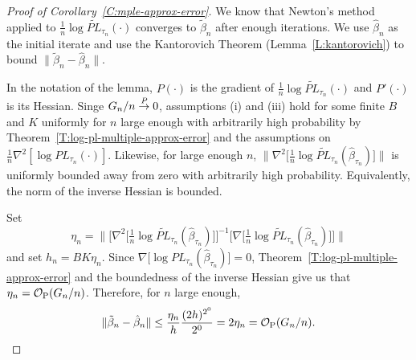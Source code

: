 \documentclass[aoas,preprint]{imsart}
\begin{document}
\begin{proof}[Proof of Corollary~\ref{C:mple-approx-error}]

We know that Newton's method applied to
$\tfrac{1}{n}\log \widetilde{\mathit{PL}}_{\tau_n}(\cdot)$ converges to
$\tilde \beta_n$ after enough iterations.  We use $\hat \beta_n$ as the
initial iterate and use the Kantorovich Theorem (Lemma~\ref{L:kantorovich})
to bound $\|\tilde \beta_n - \hat \beta_n\|$.  

In the notation of the lemma, $P(\cdot)$ is the gradient of
$\tfrac{1}{n} \log \widetilde{\mathit{PL}}_{\tau_n}(\cdot)$ and $P'(\cdot)$ is its Hessian.
Singe $G_n/n \overset{\mathit{P}}{\to} 0$, assumptions (i) and (iii) hold for
some finite $B$ and $K$ uniformly for $n$ large enough with arbitrarily
high probability by
Theorem~\ref{T:log-pl-multiple-approx-error}
and the assumptions on $\tfrac{1}{n} \nabla^2 [\log {\mathit{PL}}_{\tau_n}(\cdot)]$.
Likewise, for large enough $n$,
\(
    \Big\|
        \nabla^2\big[
            \tfrac{1}{n}
            \log \widetilde{\mathit{PL}}_{\tau_n}(\hat \beta_{\tau_n})
        \big]
    \Big\|
\)
is uniformly bounded away from zero with arbitrarily high probability.
Equivalently, the norm of the inverse Hessian is bounded.

Set
\[
    \eta_n =
    \Big\|
        \Big[
            \nabla^2\big[
                \tfrac{1}{n}
                \log \widetilde{\mathit{PL}}_{\tau_n}(\hat \beta_{\tau_n})
            \big]
        \Big]^{-1}
        \Big[
            \nabla\big[
                \tfrac{1}{n}
                \log \widetilde{\mathit{PL}}_{\tau_n}(\hat \beta_{\tau_n})
            \big]
        \Big]
    \Big\|
\]
and set $h_n = B K \eta_n$.
Since $\nabla\big[\log {\mathit{PL}}_{\tau_n}(\hat \beta_{\tau_n})\big] = 0$,
Theorem~\ref{T:log-pl-multiple-approx-error} and the boundedness of the
inverse Hessian give us that $\eta_n = \mathcal{O}_\text{P}(G_n/n)$.  Therefore, for $n$
large enough,
\[
    \| \tilde \beta_n - \hat \beta_n \|
        \leq \frac{\eta_n}{h}\frac{(2h)^{2^0}}{2^0}
        = 2 \eta_n
        = \mathcal{O}_\text{P}(G_n/n).
    \qedhere
\]
\end{proof}




\end{document}
